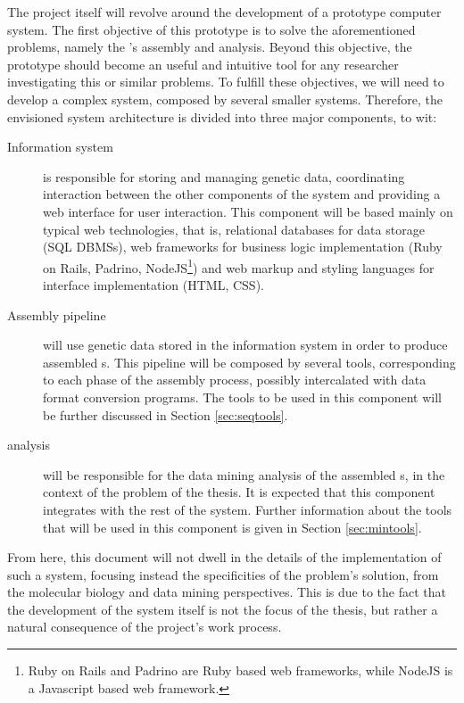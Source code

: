 The project itself will revolve around the development of a prototype computer
system. The first objective of this prototype is to solve the aforementioned
problems, namely the \trans 's assembly and analysis. Beyond this objective, the
prototype should become an useful and intuitive tool for any researcher
investigating this or similar problems. To fulfill these objectives, we will
need to develop a complex system, composed by several smaller systems.
Therefore, the envisioned system architecture is divided into three major
components, to wit:

\begin{description}

  \item[Information system]
  is responsible for storing and managing genetic data, coordinating interaction
  between the other components of the system and providing a web interface for
  user interaction. This component will be based mainly on typical web
  technologies, that is, relational databases for data storage (SQL DBMSs), web
  frameworks for business logic implementation (Ruby on Rails, Padrino,
  NodeJS\footnote{Ruby on Rails and Padrino are Ruby based web frameworks, while
  NodeJS is a Javascript based web framework.}) and web markup and styling
  languages for interface implementation (HTML, CSS).

  \item[Assembly pipeline]
  will use genetic data stored in the information system in order to produce
  assembled \trans s. This pipeline will be composed by several tools,
  corresponding to each phase of the assembly process, possibly intercalated
  with data format conversion programs. The tools to be used in this component
  will be further discussed in Section \ref{sec:seqtools}.

  \item[\Trans{} analysis]
  will be responsible for the data mining analysis of the assembled \trans s, in
  the context of the problem of the thesis. It is expected that this component
  integrates with the rest of the system. Further information about the tools
  that will be used in this component is given in Section \ref{sec:mintools}.

\end{description}

From here, this document will not dwell in the details of the implementation of
such a system, focusing instead the specificities of the problem's solution,
from the molecular biology and data mining perspectives. This is due to the fact
that the development of the system itself is not the focus of the thesis, but
rather a natural consequence of the project's work process.


